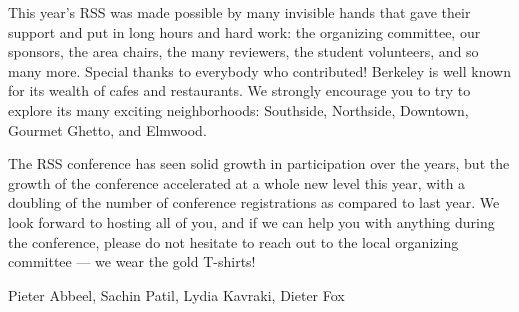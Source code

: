 This year’s RSS was made possible by many invisible hands that gave their support and put in long hours and hard work: the organizing committee, our sponsors, the area chairs, the many reviewers, the student volunteers, and so many more.  Special thanks to everybody who contributed! Berkeley is well known for its wealth of cafes and restaurants.  We strongly encourage you to try to explore its many exciting neighborhoods: Southside, Northside, Downtown, Gourmet Ghetto, and Elmwood.

\vspace{1mm}

The RSS conference has seen solid growth in participation over the years, but the growth of the conference accelerated at a whole new level this year, with a doubling of the number of conference registrations as compared to last year. We look forward to hosting all of you, and if we can help you with anything during the conference, please do not hesitate to reach out to the local organizing committee — we wear the gold T-shirts!  

\vspace{1cm}

Pieter Abbeel, Sachin Patil, Lydia Kavraki, Dieter Fox
%
\endgroup{}
\normalsize

